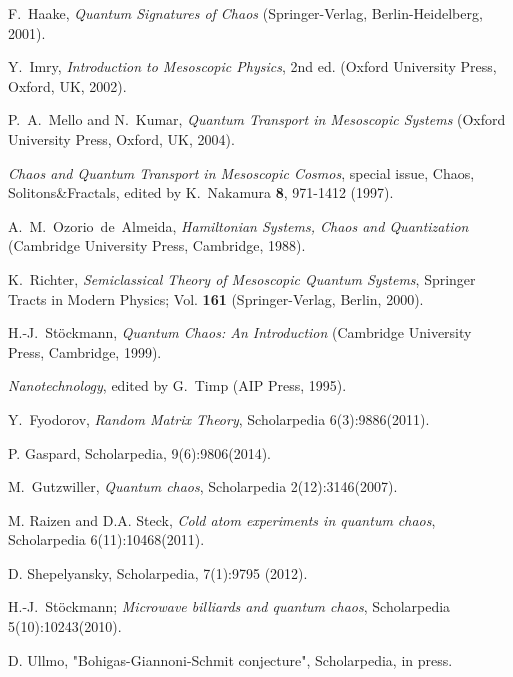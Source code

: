 \documentclass[a4paper,10pt]{article}
\begin{document}
\begin{thebibliography}{Cucc~02b}
F.~Haake,
{\it Quantum Signatures of Chaos} 
(Springer-Verlag, Berlin-Heidelberg, 2001).

Y.~Imry, {\it Introduction to Mesoscopic Physics}, 2nd ed. 
(Oxford University Press, Oxford, UK, 2002). 

P.\ A.\ Mello and N.\ Kumar, \textit{Quantum Transport in Mesoscopic Systems} (Oxford University Press, Oxford, UK, 2004).

{\it Chaos and Quantum Transport in Mesoscopic Cosmos},
special issue, Chaos, Solitons\&Fractals, edited by K.~Nakamura
{\bf 8}, 971-1412 (1997).

A.~M.~Ozorio~de~Almeida,
{\it Hamiltonian Systems, Chaos and  Quantization} 
(Cambridge University Press, Cambridge, 1988).

 K.~Richter, 
{\it Semiclassical Theory of Mesoscopic
Quantum Systems}, Springer Tracts in Modern Physics; Vol. {\bf 161} (Springer-Verlag, Berlin, 2000).

H.-J.~St\"ockmann,
{\it Quantum Chaos: An Introduction} 
(Cambridge University Press, Cambridge, 1999).

{\it Nanotechnology}, edited by G.~Timp (AIP Press, 1995).

\end{thebibliography}


\renewcommand{\refname}{Internal references}
\begin{thebibliography}{Cucc~02b}

Y.~Fyodorov, {\it Random Matrix Theory}, Scholarpedia
  6(3):9886(2011).

P. Gaspard, Scholarpedia, 9(6):9806(2014).

\bibitem[i-Gutzwiller~07] M.~Gutzwiller, {\it Quantum chaos}, Scholarpedia
  2(12):3146(2007).

M. Raizen and D.A. Steck, {\it Cold atom experiments in quantum
  chaos}, Scholarpedia 6(11):10468(2011).

D. Shepelyansky, Scholarpedia, 7(1):9795 (2012).

H.-J.~St{\"o}ckmann; {\it Microwave billiards and quantum chaos},
  Scholarpedia 5(10):10243(2010).

D. Ullmo, 
"Bohigas-Giannoni-Schmit conjecture",
Scholarpedia, in press.


\end{thebibliography}

\renewcommand{\refname}{External links}
\begin{thebibliography}{Cucc~02b}


\end{thebibliography}
\end{document}
